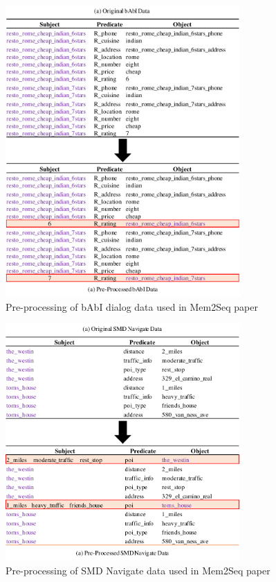 \begin{figure}[ht]
\centering
\includegraphics[width=0.8\textwidth]{assets/babi-preprocess.pdf}
\caption{Pre-processing of bAbI dialog data used in Mem2Seq paper}
\label{fig:prebabi}
\end{figure}

\begin{figure}[ht]
\centering
\includegraphics[width=0.8\textwidth]{assets/smd-preprocess.pdf}
\caption{Pre-processing of SMD Navigate data used in Mem2Seq paper}
\label{fig:presmd}
\end{figure}

